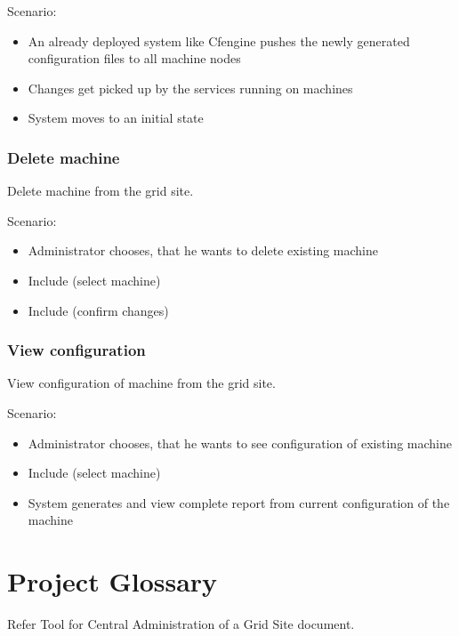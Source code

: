 \documentclass{article}
\begin{document}
Scenario:
\begin{itemize}
    \item{An already deployed system like Cfengine pushes the newly generated
        configuration files to all machine nodes}
    \item{Changes get picked up by the services running on machines}
    \item{System moves to an initial state}
\end{itemize}


\subsubsection{Delete machine}
Delete machine from the grid site.

Scenario:
\begin{itemize}
\item{Administrator chooses, that he wants to delete existing machine}
\item{Include (select machine)}
\item{Include (confirm changes)}
\end{itemize}

\subsubsection{View configuration}
View configuration of machine from the grid site.

Scenario:
\begin{itemize}
\item{Administrator chooses, that he wants to see configuration of existing machine}
\item{Include (select machine)}
\item{System generates and view complete report from current configuration of the machine}
\end{itemize}

\section{Project Glossary}

Refer Tool for Central Administration of a Grid Site document.
\end{document}
